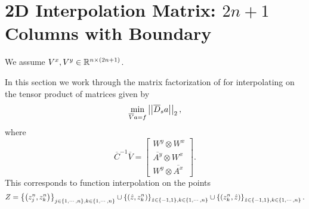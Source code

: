 \section{2D \CV{} Interpolation Matrix: $2n+1$ Columns with Boundary}
\label{sec:CV_2D_2n_E}

We assume $V^{x},V^{y}\in\mathbb{R}^{n\times(2n+1)}$.

In this section we work through the matrix factorization
of for interpolating on the tensor product of \CV{}
matrices given by
%
\begin{equation}
    \min_{\overline{V}a=f} \left| \left| \overline{D}_{s}a \right| \right|_{2},
\end{equation}
%
where
%
\begin{equation}
    \overline{C}^{-1}\overline{V}
    = \begin{bmatrix}
        W^{y} \otimes W^{x} \\
        \overline{A^{y}} \otimes W^{x} \\
        W^{y} \otimes \overline{A^{x}} 
    \end{bmatrix}.
\end{equation}
%
This corresponds to function interpolation on the points
%
\begin{equation}
    Z = \left\{ \left( z^{n}_{j},z^{n}_{k} \right) \right\}_{j\in\left\{ 1,\cdots,n \right\},
            k\in\left\{ 1,\cdots,n \right\}} \cup
        \left\{ \left( \hat{z},z^{n}_{k} \right) \right\}_{\hat{z}\in\left\{ -1,1 \right\},
            k\in\left\{ 1,\cdots,n \right\}} \cup
        \left\{ \left( z^{n}_{k},\hat{z} \right) \right\}_{\hat{z}\in\left\{ -1,1 \right\},
            k\in\left\{ 1,\cdots,n \right\}}.
\end{equation}

